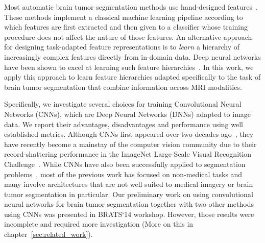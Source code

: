 \documentclass[final,5p,times,twocolumn]{elsarticle}
\begin{document}
 Most automatic brain tumor segmentation methods use hand-designed features~\citep{braintumorsegmentationdotorg,Menze2014}.  These methods implement a classical machine learning pipeline according to which features are first extracted and then given to a classifier whose training procedure does not affect the nature of those features. An alternative approach for designing task-adapted feature representations is to {\it learn} a hierarchy of increasingly complex features directly from in-domain data. Deep neural networks have been shown to excel at learning such feature hierarchies~\citep{bengio2013}.  In this work, we apply this approach to learn feature hierarchies adapted specifically to the task of brain tumor segmentation that combine information across MRI modalities.


Specifically, we investigate several choices for training Convolutional Neural Networks (CNNs), which are Deep Neural Networks (DNNs) adapted to image data. We report their advantages, disadvantages and performance using well established metrics. %
  Although CNNs first appeared over two decades ago~\citep{lecun1998},
they have recently become a mainstay of the computer vision community due to their record-shattering performance in the ImageNet Large-Scale Visual Recognition Challenge~\citep{Krizhevsky-2012-small}.
While CNNs have also been successfully applied to segmentation problems~\citep{Alvarez2012,long_shelhamer_fcn,SimulDetectSegm, ciresan2012}, most of the previous work has focused on non-medical tasks and many involve architectures that are not well suited to medical imagery or brain tumor segmentation in particular.  Our preliminary work on using convolutional neural networks for brain tumor segmentation together with two other methods using CNNs was presented in BRATS`14 workshop. However, those results were incomplete and required more investigation (More on this in chapter~\ref{sec:related_work}).
\end{document}
